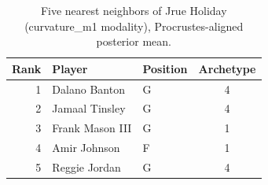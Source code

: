 \begin{table}[htbp]
  \centering\small
  \begin{tabular}{rllc}
    \toprule
    Rank & Player & Position & Archetype \\
    \midrule
    1 & Dalano Banton & G & 4 \\
    2 & Jamaal Tinsley & G & 4 \\
    3 & Frank Mason III & G & 1 \\
    4 & Amir Johnson & F & 1 \\
    5 & Reggie Jordan & G & 4 \\
    \bottomrule
  \end{tabular}
  \caption{Five nearest neighbors of Jrue Holiday (curvature_m1 modality), Procrustes-aligned posterior mean.}
  \label{tab:Jrue_Holiday_neighbors_curvature_m1}
\end{table}

